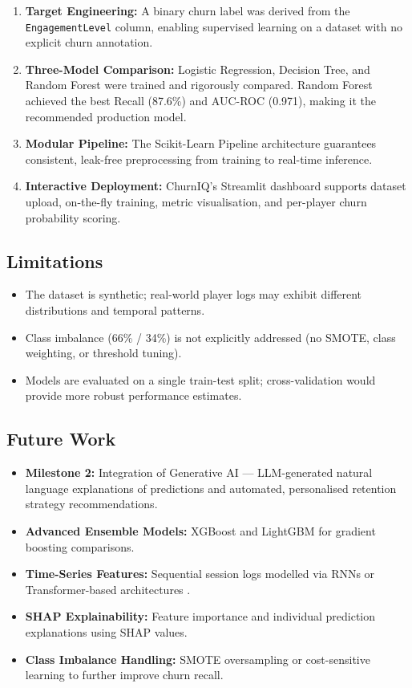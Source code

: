 \documentclass[12pt, a4paper]{article}
\begin{document}
\begin{enumerate}
    \item \textbf{Target Engineering:} A binary churn label was derived
    from the \texttt{EngagementLevel} column, enabling supervised learning
    on a dataset with no explicit churn annotation.

    \item \textbf{Three-Model Comparison:} Logistic Regression, Decision
    Tree, and Random Forest were trained and rigorously compared.
    Random Forest achieved the best Recall (87.6\%) and AUC-ROC (0.971),
    making it the recommended production model.

    \item \textbf{Modular Pipeline:} The Scikit-Learn Pipeline architecture
    guarantees consistent, leak-free preprocessing from training to
    real-time inference.

    \item \textbf{Interactive Deployment:} ChurnIQ's Streamlit dashboard
    supports dataset upload, on-the-fly training, metric visualisation,
    and per-player churn probability scoring.
\end{enumerate}

\subsection{Limitations}

\begin{itemize}
    \item The dataset is synthetic; real-world player logs may exhibit
    different distributions and temporal patterns.
    \item Class imbalance (66\% / 34\%) is not explicitly addressed (no
    SMOTE, class weighting, or threshold tuning).
    \item Models are evaluated on a single train-test split; cross-validation
    would provide more robust performance estimates.
\end{itemize}

\subsection{Future Work}

\begin{itemize}
    \item \textbf{Milestone 2:} Integration of Generative AI —
    LLM-generated natural language explanations of predictions and
    automated, personalised retention strategy recommendations.
    \item \textbf{Advanced Ensemble Models:} XGBoost and LightGBM for
    gradient boosting comparisons.
    \item \textbf{Time-Series Features:} Sequential session logs modelled
    via RNNs or Transformer-based architectures \cite{bertens2017}.
    \item \textbf{SHAP Explainability:} Feature importance and
    individual prediction explanations using SHAP values.
    \item \textbf{Class Imbalance Handling:} SMOTE oversampling or
    cost-sensitive learning to further improve churn recall.
\end{itemize}
\end{document}
